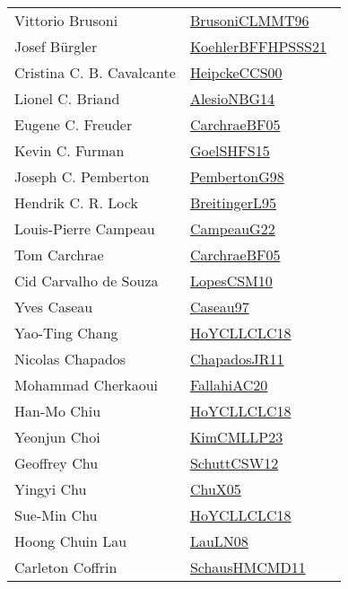 {\begin{longtable}{p{4cm}p{20cm}}
Vittorio Brusoni & \href{works/BrusoniCLMMT96.pdf}{BrusoniCLMMT96}~\cite{BrusoniCLMMT96}\\
Josef B{\"{u}}rgler & \href{works/KoehlerBFFHPSSS21.pdf}{KoehlerBFFHPSSS21}~\cite{KoehlerBFFHPSSS21}\\
Cristina C. B. Cavalcante & \href{works/HeipckeCCS00.pdf}{HeipckeCCS00}~\cite{HeipckeCCS00}\\
Lionel C. Briand & \href{works/AlesioNBG14.pdf}{AlesioNBG14}~\cite{AlesioNBG14}\\
Eugene C. Freuder & \href{works/CarchraeBF05.pdf}{CarchraeBF05}~\cite{CarchraeBF05}\\
Kevin C. Furman & \href{works/GoelSHFS15.pdf}{GoelSHFS15}~\cite{GoelSHFS15}\\
Joseph C. Pemberton & \href{works/PembertonG98.pdf}{PembertonG98}~\cite{PembertonG98}\\
Hendrik C. R. Lock & \href{}{BreitingerL95}~\cite{BreitingerL95}\\
Louis{-}Pierre Campeau & \href{works/CampeauG22.pdf}{CampeauG22}~\cite{CampeauG22}\\
Tom Carchrae & \href{works/CarchraeBF05.pdf}{CarchraeBF05}~\cite{CarchraeBF05}\\
Cid Carvalho de Souza & \href{works/LopesCSM10.pdf}{LopesCSM10}~\cite{LopesCSM10}\\
Yves Caseau & \href{works/Caseau97.pdf}{Caseau97}~\cite{Caseau97}\\
Yao{-}Ting Chang & \href{works/HoYCLLCLC18.pdf}{HoYCLLCLC18}~\cite{HoYCLLCLC18}\\
Nicolas Chapados & \href{works/ChapadosJR11.pdf}{ChapadosJR11}~\cite{ChapadosJR11}\\
Mohammad Cherkaoui & \href{works/FallahiAC20.pdf}{FallahiAC20}~\cite{FallahiAC20}\\
Han{-}Mo Chiu & \href{works/HoYCLLCLC18.pdf}{HoYCLLCLC18}~\cite{HoYCLLCLC18}\\
Yeonjun Choi & \href{works/KimCMLLP23.pdf}{KimCMLLP23}~\cite{KimCMLLP23}\\
Geoffrey Chu & \href{works/SchuttCSW12.pdf}{SchuttCSW12}~\cite{SchuttCSW12}\\
Yingyi Chu & \href{works/ChuX05.pdf}{ChuX05}~\cite{ChuX05}\\
Sue{-}Min Chu & \href{works/HoYCLLCLC18.pdf}{HoYCLLCLC18}~\cite{HoYCLLCLC18}\\
Hoong Chuin Lau & \href{works/LauLN08.pdf}{LauLN08}~\cite{LauLN08}\\
Carleton Coffrin & \href{works/SchausHMCMD11.pdf}{SchausHMCMD11}~\cite{SchausHMCMD11}\\

\end{longtable}}

